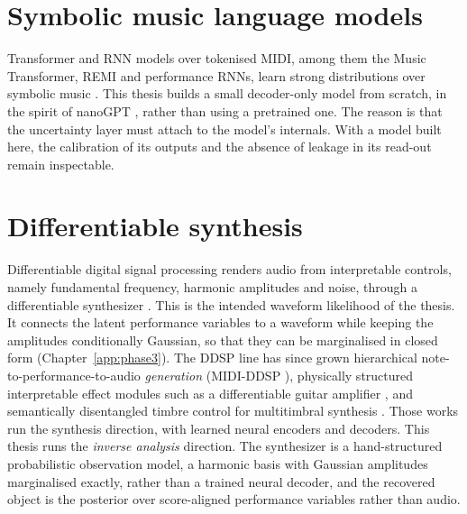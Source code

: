 \section{Symbolic music language models}
Transformer and RNN models over tokenised MIDI, among them the Music
Transformer, REMI and performance RNNs, learn strong distributions over
symbolic music \cite{musictransformer,remi,oore2018}. This thesis builds a
small decoder-only model from scratch, in the spirit of nanoGPT
\cite{nanogpt}, rather than using a pretrained one. The reason is that the
uncertainty layer must attach to the model's internals. With a model built
here, the calibration of its outputs and the absence of leakage in its
read-out remain inspectable.

\section{Differentiable synthesis}
Differentiable digital signal processing renders audio from interpretable
controls, namely fundamental frequency, harmonic amplitudes and noise,
through a differentiable synthesizer \cite{ddsp}. This is the intended
waveform likelihood of the thesis. It connects the latent performance
variables to a waveform while keeping the amplitudes conditionally
Gaussian, so that they can be marginalised in closed form
(Chapter~\ref{app:phase3}). The DDSP line has since grown hierarchical
note-to-performance-to-audio \emph{generation} (MIDI-DDSP
\cite{wu2022midi}), physically structured interpretable effect modules such
as a differentiable guitar amplifier \cite{yeh2024ddspamp}, and semantically
disentangled timbre control for multitimbral synthesis \cite{dalri2026}.
Those works run the synthesis direction, with learned neural encoders and
decoders. This thesis runs the \emph{inverse analysis} direction. The
synthesizer is a hand-structured probabilistic observation model, a harmonic
basis with Gaussian amplitudes marginalised exactly, rather than a trained
neural decoder, and the recovered object is the posterior over
score-aligned performance variables rather than audio.

